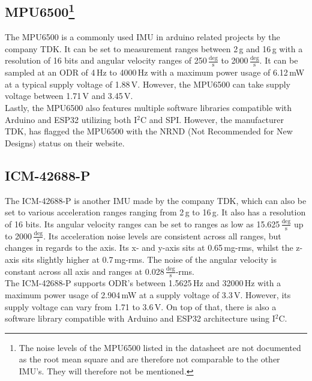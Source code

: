 \documentclass[fontsize=11pt,%
twoside,%
BCOR          = 8mm, %
DIV           = 11,  %
titlepage     = off,%
index=totoc,%
xcolor        = pdftex,%
dvipsnames,%
bibliography  = totoc,%
bibliography = numbered, %
listof        = notnumbered]{scrreprt}
\begin{document}
\subsection{MPU6500\footnote{The noise levels of the MPU6500 listed in the datasheet are not documented as the root mean square and are therefore not comparable to the other IMU's. They will therefore not be mentioned.}}
The MPU6500 is a commonly used IMU in arduino related projects by the company TDK. It can be set to measurement ranges between 2\,g and 16\,g with a resolution of 16 bits and angular velocity ranges of 250\,$\frac{\text{deg}}{\text{s}}$ to 2000\,$\frac{\text{deg}}{\text{s}}$. It can be sampled at an ODR of 4\,Hz to 4000\,Hz with a maximum power usage of 6.12\,mW at a typical supply voltage of 1.88\,V. However, the MPU6500 can take supply voltage between 1.71\,V and 3.45\,V.\\
Lastly, the MPU6500 also features multiple software libraries compatible with Arduino and ESP32 utilizing both I$^2$C and SPI. However, the manufacturer TDK, has flagged the MPU6500 with the NRND (Not Recommended for New Designs) status on their website.

\subsection{ICM-42688-P}
The ICM-42688-P is another IMU made by the company TDK, which can also be set to various acceleration ranges ranging from 2\,g to 16\,g. It also has a resolution of 16 bits. Its angular velocity ranges can be set to ranges as low as 15.625\,$\frac{\text{deg}}{\text{s}}$ up to 2000\,$\frac{\text{deg}}{\text{s}}$. Its acceleration noise levels are consistent across all ranges, but changes in regards to the axis. Its x- and y-axis sits at 0.65\,mg-rms, whilst the z-axis sits slightly higher at 0.7\,mg-rms. The noise of the angular velocity is constant across all axis and ranges at 0.028\,$\frac{\text{deg}}{\text{s}}$-rms.\\
The ICM-42688-P supports ODR's between 1.5625\,Hz and 32000\,Hz with a maximum power usage of 2.904\,mW at a supply voltage of 3.3\,V. However, its supply voltage can vary from 1.71 to 3.6\,V. On top of that, there is also a software library compatible with Arduino and ESP32 architecture using I$^2$C.
\end{document}
